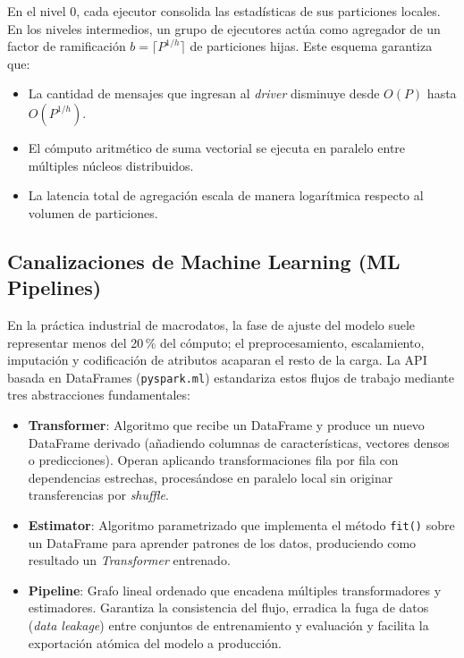 \documentclass[conference,a4paper]{IEEEtran}
\begin{document}
En el nivel 0, cada ejecutor consolida las estadísticas de sus particiones locales. En los niveles intermedios, un grupo de ejecutores actúa como agregador de un factor de ramificación $b = \lceil P^{1/h} \rceil$ de particiones hijas. Este esquema garantiza que:
\begin{itemize}
\item La cantidad de mensajes que ingresan al \textit{driver} disminuye desde $O(P)$ hasta $O(P^{1/h})$.
\item El cómputo aritmético de suma vectorial se ejecuta en paralelo entre múltiples núcleos distribuidos.
\item La latencia total de agregación escala de manera logarítmica respecto al volumen de particiones.
\end{itemize}

\subsection{Canalizaciones de Machine Learning (ML Pipelines)}

En la práctica industrial de macrodatos, la fase de ajuste del modelo suele representar menos del 20\,\% del cómputo; el preprocesamiento, escalamiento, imputación y codificación de atributos acaparan el resto de la carga. La API basada en DataFrames (\texttt{pyspark.ml}) estandariza estos flujos de trabajo mediante tres abstracciones fundamentales:

\begin{itemize}
\item \textbf{Transformer}: Algoritmo que recibe un DataFrame y produce un nuevo DataFrame derivado (añadiendo columnas de características, vectores densos o predicciones). Operan aplicando transformaciones fila por fila con dependencias estrechas, procesándose en paralelo local sin originar transferencias por \textit{shuffle}.
\item \textbf{Estimator}: Algoritmo parametrizado que implementa el método \texttt{fit()} sobre un DataFrame para aprender patrones de los datos, produciendo como resultado un \textit{Transformer} entrenado.
\item \textbf{Pipeline}: Grafo lineal ordenado que encadena múltiples transformadores y estimadores. Garantiza la consistencia del flujo, erradica la fuga de datos (\textit{data leakage}) entre conjuntos de entrenamiento y evaluación y facilita la exportación atómica del modelo a producción.
\end{itemize}
\end{document}
